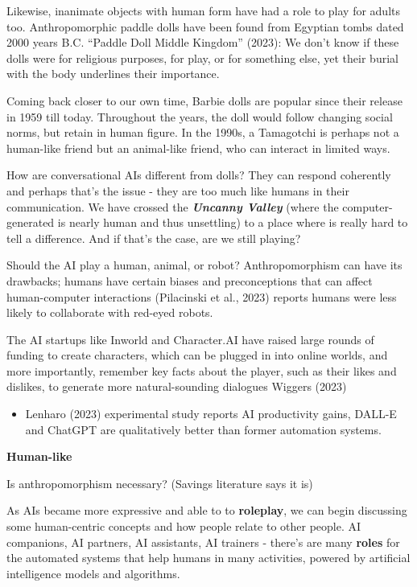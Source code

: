 \documentclass[
  letterpaper,
  DIV=11,
  numbers=noendperiod]{scrartcl}
\providecommand{\tightlist}{%
  \setlength{\itemsep}{0pt}\setlength{\parskip}{0pt}}\usepackage{longtable,booktabs,array}
\begin{document}
Likewise, inanimate objects with human form have had a role to play for
adults too. Anthropomorphic paddle dolls have been found from Egyptian
tombs dated 2000 years B.C. {``Paddle {Doll} {\textbar} {Middle
Kingdom}''} (2023): We don't know if these dolls were for religious
purposes, for play, or for something else, yet their burial with the
body underlines their importance.

Coming back closer to our own time, Barbie dolls are popular since their
release in 1959 till today. Throughout the years, the doll would follow
changing social norms, but retain in human figure. In the 1990s, a
Tamagotchi is perhaps not a human-like friend but an animal-like friend,
who can interact in limited ways.

How are conversational AIs different from dolls? They can respond
coherently and perhaps that's the issue - they are too much like humans
in their communication. We have crossed the \textbf{\emph{Uncanny
Valley}} (where the computer-generated is nearly human and thus
unsettling) to a place where is really hard to tell a difference. And if
that's the case, are we still playing?

Should the AI play a human, animal, or robot? Anthropomorphism can have
its drawbacks; humans have certain biases and preconceptions that can
affect human-computer interactions (Pilacinski et al., 2023) reports
humans were less likely to collaborate with red-eyed robots.

The AI startups like Inworld and Character.AI have raised large rounds
of funding to create characters, which can be plugged in into online
worlds, and more importantly, remember key facts about the player, such
as their likes and dislikes, to generate more natural-sounding dialogues
Wiggers (2023)

\begin{itemize}
\tightlist
\item
  Lenharo (2023) experimental study reports AI productivity gains,
  DALL-E and ChatGPT are qualitatively better than former automation
  systems.
\end{itemize}

\textbf{Human-like}

Is anthropomorphism necessary? (Savings literature says it is)

As AIs became more expressive and able to to \textbf{roleplay}, we can
begin discussing some human-centric concepts and how people relate to
other people. AI companions, AI partners, AI assistants, AI trainers -
there's are many \textbf{roles} for the automated systems that help
humans in many activities, powered by artificial intelligence models and
algorithms.
\end{document}
